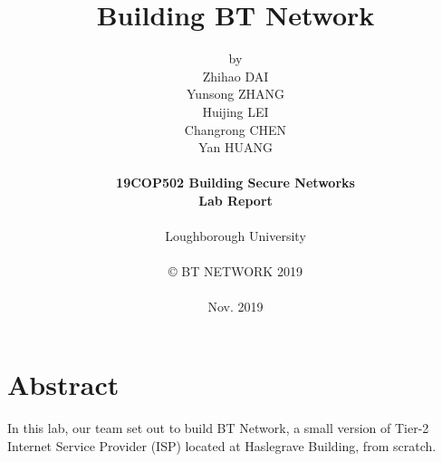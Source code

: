 \title{\bf Building BT Network}

\author{by\\
Zhihao DAI\\
Yunsong ZHANG\\
Huijing LEI\\
Changrong CHEN\\
Yan HUANG\\
\\
{\bf 19COP502 Building Secure Networks}\\
{\bf Lab Report}\\
\\
Loughborough University\\
\\
\copyright
\hspace{1 dd} BT NETWORK 2019\\
\\
Nov. 2019
}
\date{} %

\maketitle


% 
% 

\chapter*{Abstract}
In this lab, our team set out to build BT Network, a small version of Tier-2 Internet Service Provider (ISP) located at Haslegrave Building, from scratch.



